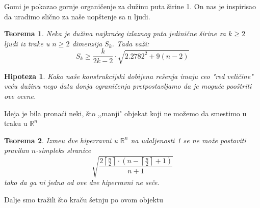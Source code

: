 \documentclass[b1paper,portrait]{template/baposter}
\newtheorem{theorem}{Teorema}
\newtheorem*{hipoteza}{Hipoteza}
\begin{document}
\begin{poster}
{\begin{center}
\begin{minipage}{0.25\linewidth}
\end{minipage}
\end{center}



	\vspace{0.15cm}
}

{
	Gomi je pokazao gornje organi\v cenje za du\v zinu puta \v sirine 1.
	On nas je inspirisao da uradimo sli\v cno za na\v se uop\v stenje sa n ljudi.
	\begin{theorem}
		Neka je du\v zina najkra\' ceg izlaznog puta jedini\v cne \v sirine za $k\geqslant 2$ ljudi iz trake u $n\geqslant 2$ dimenzija $S_k$. Tada va\v zi:
		$$S_k\geqslant\frac{k}{2k-2}\cdot \sqrt{2.2782^2+9(n-2)}$$
	\end{theorem}
	\begin{hipoteza}
		Kako na\v se konstrukcijski dobijena re\v senja imaju ceo "red veli\v cine" ve\' cu du\v zinu nego 
		data donja ograni\v cenja pretpostavljamo da je mogu\' ce poo\v striti ove ocene. 
	\end{hipoteza}
	\vspace{0.15cm}
}



{
 	Ideja je bila  prona\' ci neki, \v sto ,,manji" objekat koji ne mo\v zemo da smestimo u traku u $\mathbb{R}^n$
 	\begin{theorem}
 		Izme\dj u dve hiperravni u $\mathbb{R}^n$ na udaljenosti 1 se ne mo\v ze postaviti pravilan $n$-simpleks stranice
 		$$\sqrt{\frac{2\left\lceil \frac{n}{2}\right\rceil\cdot \left( n-\left\lceil\frac{n}{2}\right\rceil+1\right)}{n+1}}$$
 		tako da ga ni jedna od ove dve hiperravni ne se\v ce. 
 	\end{theorem}
 	Dalje smo tra\v zili \v sto kra\v cu \' setnju po ovom objektu

}
\end{poster}
\end{document}
